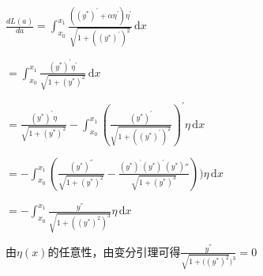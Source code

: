 \documentclass{article}
\begin{document}
$\frac{dL(a)}{da}=\int_{x_{0}}^{x_{1}}\frac{((y^{*})^{'}+\alpha\eta^{'})\eta^{'}}{\sqrt{1+((y^{*})^{'})^2}}\,\mathrm{d}x$

$=\int_{x_{0}}^{x_{1}}\frac{(y^{*})^{'}\eta^{'}}{\sqrt{1+(y^{*})^2}}\,\mathrm{d}x$ 

$=\frac{(y^{*})^{'}\eta}{\sqrt{1+(y^{*})^2}}-\int_{x_{0}}^{x_{1}}(\frac{(y^{*})^{'}}{\sqrt{1+((y^{*})^{'})^2}})^{'}\eta\,\mathrm{d}x$

$=-\int_{x_{0}}^{x_{1}}(\frac{(y^{*})^{''}}{\sqrt{1+(y^{*})^2}}-\frac{(y^{*})^{'} (y^{*})^{'}(y^{*}){''}}{\sqrt{1+(y^{*})^3}}))\eta\,\mathrm{d}x$

$=-\int_{x_{0}}^{x_{1}}\frac{y^{''}}{\sqrt{1+((y^{*})^{2})^3}}\eta\,\mathrm{d}x$

由$\eta(x)$的任意性，由变分引理可得$\frac{y^{''}}{\sqrt{1+((y^{*})^{2}})^{3}}=0$


\end{document}
